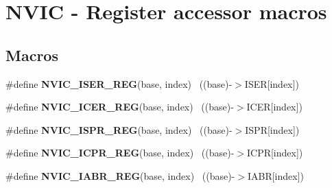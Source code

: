 \hypertarget{group___n_v_i_c___register___accessor___macros}{}\section{N\+V\+I\+C -\/ Register accessor macros}
\label{group___n_v_i_c___register___accessor___macros}
\subsection*{Macros}
\begin{DoxyCompactItemize}
\item 
\hypertarget{group___n_v_i_c___register___accessor___macros_ga7009a9a09ee7fbb0b2af4cf99eadac4f}{}\#define {\bfseries N\+V\+I\+C\+\_\+\+I\+S\+E\+R\+\_\+\+R\+E\+G}(base,  index)                            ~((base)-\/$>$I\+S\+E\+R\mbox{[}index\mbox{]})\label{group___n_v_i_c___register___accessor___macros_ga7009a9a09ee7fbb0b2af4cf99eadac4f}

\item 
\hypertarget{group___n_v_i_c___register___accessor___macros_gac8c6980a2505e16c70595552bc4da081}{}\#define {\bfseries N\+V\+I\+C\+\_\+\+I\+C\+E\+R\+\_\+\+R\+E\+G}(base,  index)                            ~((base)-\/$>$I\+C\+E\+R\mbox{[}index\mbox{]})\label{group___n_v_i_c___register___accessor___macros_gac8c6980a2505e16c70595552bc4da081}

\item 
\hypertarget{group___n_v_i_c___register___accessor___macros_ga6678e35df7fd1dd4a3f515e73983377c}{}\#define {\bfseries N\+V\+I\+C\+\_\+\+I\+S\+P\+R\+\_\+\+R\+E\+G}(base,  index)                            ~((base)-\/$>$I\+S\+P\+R\mbox{[}index\mbox{]})\label{group___n_v_i_c___register___accessor___macros_ga6678e35df7fd1dd4a3f515e73983377c}

\item 
\hypertarget{group___n_v_i_c___register___accessor___macros_gac541bfbfb551d341170d1535a18208b9}{}\#define {\bfseries N\+V\+I\+C\+\_\+\+I\+C\+P\+R\+\_\+\+R\+E\+G}(base,  index)                            ~((base)-\/$>$I\+C\+P\+R\mbox{[}index\mbox{]})\label{group___n_v_i_c___register___accessor___macros_gac541bfbfb551d341170d1535a18208b9}

\item 
\hypertarget{group___n_v_i_c___register___accessor___macros_gafa3b717b76dfe3379645d3c4eaebaf6b}{}\#define {\bfseries N\+V\+I\+C\+\_\+\+I\+A\+B\+R\+\_\+\+R\+E\+G}(base,  index)                            ~((base)-\/$>$I\+A\+B\+R\mbox{[}index\mbox{]})\label{group___n_v_i_c___register___accessor___macros_gafa3b717b76dfe3379645d3c4eaebaf6b}


\end{DoxyCompactItemize}
